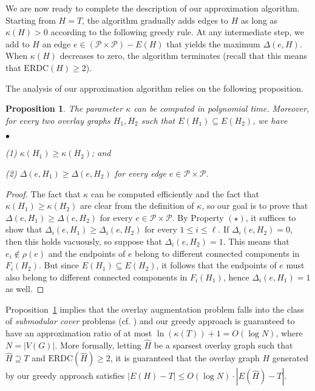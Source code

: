 \LongVersion \documentclass[11pt]{article}
\newtheorem{proposition}[theorem]{Proposition}
\theoremstyle{definition}
\theoremstyle{plain}
\newcommand{\Vertices}[0]{\mathit{V}}
\newcommand{\Edges}[0]{\mathit{E}}
\newcommand{\Peers}[0]{\mathcal{P}}
\newcommand{\ERDC}[0]{\mathrm{ERDC}}
\newcounter{smallitemizec}
\newenvironment{smallitemize}
{   \setcounter{smallitemizec}{0}
    \vspace{-0.5ex}
  \begin{list}{$\bullet$}
    {\usecounter{smallitemizec}
      \setlength{\parsep}{0pt}
      \setlength{\itemsep}{0pt}}
    }{ \end{list}
   \vspace{-0.5ex}
}
\begin{document}
We are now ready to complete the description of our approximation algorithm.
Starting from $H = T$, the algorithm gradually adds edges to $H$ as long as
$\kappa(H) > 0$ according to the following greedy rule.
At any intermediate step, we add to $H$ an edge $e \in (\Peers \times \Peers)
- \Edges(H)$ that yields the maximum $\Delta(e, H)$.
When $\kappa(H)$ decreases to zero, the algorithm terminates (recall that this
means that $\ERDC(H) \geq 2$).

The analysis of our approximation algorithm relies on the following
proposition.

\begin{proposition} \label{proposition:Submodularity}
The parameter $\kappa$ can be computed in polynomial time.
Moreover, for every two overlay graphs $H_1, H_2$ such that $\Edges(H_1)
\subseteq \Edges(H_2)$, we have
\begin{smallitemize}
\item[\rm (1)]
$\kappa(H_1) \geq \kappa(H_2)$; and
\item[\rm (2)]
$\Delta(e, H_1) \geq \Delta(e, H_2)$ for every edge $e \in \Peers \times
\Peers$.
\end{smallitemize}
\end{proposition}
\begin{proof}
The fact that $\kappa$ can be computed efficiently and the fact that
$\kappa(H_1) \geq \kappa(H_2)$ are clear from the definition of $\kappa$, so
our goal is to prove that $\Delta(e, H_1) \geq \Delta(e, H_2)$ for every $e
\in \Peers \times \Peers$.
By Property $\mathbf{(\star)}$, it suffices to show that
$\Delta_{i}(e, H_1) \geq \Delta_{i}(e, H_2)$ for every $1 \leq i \leq \ell$.
If $\Delta_{i}(e, H_2) = 0$, then this holds vacuously, so suppose that
$\Delta_{i}(e, H_2) = 1$.
This means that $e_i \notin \rho(e)$ and the endpoints of $e$ belong to
different connected components in $F_{i}(H_2)$.
But since $\Edges(H_1) \subseteq \Edges(H_2)$, it follows that the endpoints
of $e$ must also belong to different connected components in $F_{i}(H_1)$,
hence $\Delta_{i}(e, H_1) = 1$ as well.
\end{proof}

Proposition~\ref{proposition:Submodularity} implies that the overlay
augmentation problem falls into the class of \emph{submodular cover} problems
(cf. \cite{W82,BKP01}) and our greedy approach is guaranteed to have an
approximation ratio of at most $\ln(\kappa(T)) + 1 = O (\log N)$, where $N =
|\Vertices(G)|$.
More formally, letting $\hat{H}$ be a sparsest overlay graph such that
$\hat{H} \supseteq T$ and $\ERDC(\hat{H}) \geq 2$, it is guaranteed that the
overlay graph $H$ generated by our greedy approach satisfies
$|\Edges(H) - T| \leq O (\log N) \cdot |\Edges(\hat{H}) - T|$.
\end{document}
